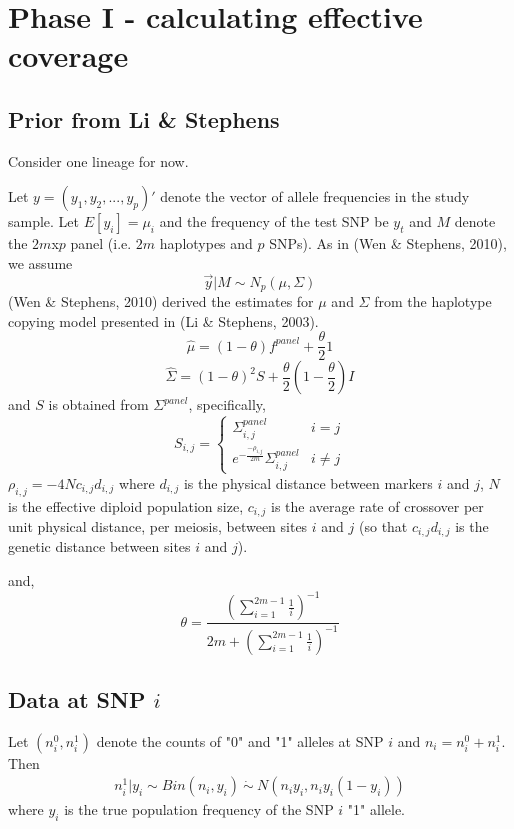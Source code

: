 \documentclass[10pt,a4paper,draft]{article}
\begin{document}
\section{Phase I - calculating effective coverage}
\subsection{Prior from Li \& Stephens}
Consider one lineage for now.

Let  $y = (y_1, y_2, ..., y_p)'$ denote the vector of allele frequencies in the study sample.
Let $E[y_{i}] = \mu_{i}$ and the frequency of the test SNP be $y_{t}$  and $M$ denote the $2m$x$p$ panel (i.e. $2m$ haplotypes and $p$ SNPs). As in (Wen \& Stephens, 2010), we assume 
\begin{equation}
\vec{y} |M \sim N_p(\mu, \Sigma) \label{eq:prior}
\end{equation}
(Wen \& Stephens, 2010) derived the estimates for $\mu$ and $\Sigma$ from the haplotype copying model presented in (Li \& Stephens, 2003).
\begin{equation}
\hat{\mu} = (1-\theta)f^{panel} + \frac{\theta}{2}1 
\end{equation}
\begin{equation}
\hat{\Sigma} = (1-\theta)^2S + \frac{\theta}{2}(1-\frac{\theta}{2})I
\end{equation}
and $S$ is obtained from $\Sigma^{panel}$, specifically,
 \begin{equation}
   S_{i,j} = \left\{
     \begin{array}{lr}
       \Sigma_{i,j}^{panel} &  i =j\\
       e^{-\frac{-\rho_{i,j}}{2m}} \Sigma_{i,j}^{panel} &  i \neq j
     \end{array}
   \right.
\end{equation} 
$\rho_{i,j} = -4Nc_{i,j}d_{i,j}$ where $d_{i,j}$ is the physical distance between markers $i$ and $j$, $N$ is the effective diploid population size, $c_{i,j}$ is the average rate of crossover per unit physical distance, per meiosis, between sites $i$ and $j$ (so that $c_{i,j}d_{i,j}$ is the genetic distance between sites $i$ and $j$). 

and,
\begin{equation}
\theta = \frac{(\sum_{i=1}^{2m-1} \frac{1}{i})^{-1}}{2m + (\sum_{i=1}^{2m-1} \frac{1}{i})^{-1}}
\end{equation}

\subsection{Data at SNP $i$}
Let $(n_i^0, n_i^1)$ denote the counts of "0" and "1" alleles at SNP $i$ and $n_i = n_i^0 + n_i^1$. Then 
\begin{align*}
n_i^1 | y_i \sim Bin(n_i, y_i) \ \dot{\sim}  \ N(n_iy_i, n_iy_i(1-y_i)) \label{eq:napprox}
\end{align*}
where $y_i$ is the true population frequency of the SNP $i$ "1" allele. 
\end{document}
